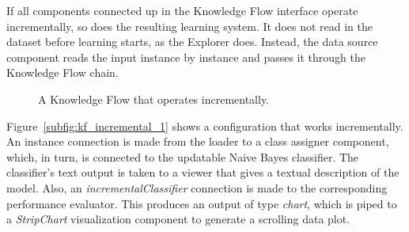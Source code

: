 If all components connected up in the Knowledge Flow interface operate
incrementally, so does the resulting learning system. It does not read
in the dataset before learning starts, as the Explorer does. Instead,
the data source component reads the input instance by instance and
passes it through the Knowledge Flow chain.

\begin{figure}[!th]
\centering
{}

\caption{\label{fig:kf_incremental}A Knowledge Flow that operates incrementally.}
\end{figure}

Figure~\ref{subfig:kf_incremental_1} shows a configuration that works incrementally. An
instance connection is made from the loader to a class assigner
component, which, in turn, is connected to the updatable Naive Bayes
classifier. The classifier's text output is taken to a viewer that
gives a textual description of the model. Also, an
\textit{incrementalClassifier} connection is made to the corresponding
performance evaluator. This produces an output of type \textit{chart},
which is piped to a \textit{StripChart} visualization component to
generate a scrolling data plot.

